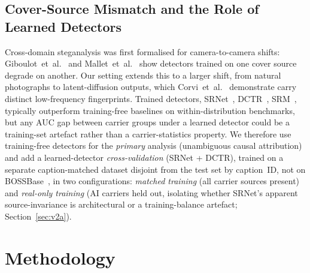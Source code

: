 \documentclass[10pt,twocolumn,a4paper]{article}
\DeclareRobustCommand{\by}[1]{\textnormal{\normalfont\footnotesize\space--- #1}}
\begin{document}
\subsection{Cover-Source Mismatch and the Role of Learned Detectors}
Cross-domain steganalysis was first formalised for camera-to-camera shifts: Giboulot~et~al.~\cite{giboulot2020csm} and Mallet~et~al.~\cite{mallet2024csm} show detectors trained on one cover source degrade on another. Our setting extends this to a larger shift, from natural photographs to latent-diffusion outputs, which Corvi~et~al.~\cite{corvi2023diffusion} demonstrate carry distinct low-frequency fingerprints. Trained detectors, SRNet~\cite{boroumand2019srnet}, DCTR~\cite{holub2015dctr}, SRM~\cite{fridrich2012srm}, typically outperform training-free baselines on within-distribution benchmarks, but any AUC gap between carrier groups under a learned detector could be a training-set artefact rather than a carrier-statistics property. We therefore use training-free detectors for the \emph{primary} analysis (unambiguous causal attribution) and add a learned-detector \emph{cross-validation} (SRNet + DCTR), trained on a separate caption-matched dataset disjoint from the test set by caption~ID, not on BOSSBase~\cite{bas2011boss}, in two configurations: \emph{matched training} (all carrier sources present) and \emph{real-only training} (AI carriers held out, isolating whether SRNet's apparent source-invariance is architectural or a training-balance artefact; Section~\ref{sec:v2a}).

\section[Methodology\by{\textbf{Writer:} David Wicker  \textbf{Reviewer:} Jimena \textbf{Contributor:}  Abdul}]{Methodology}

\label{sec:methods}
\end{document}
